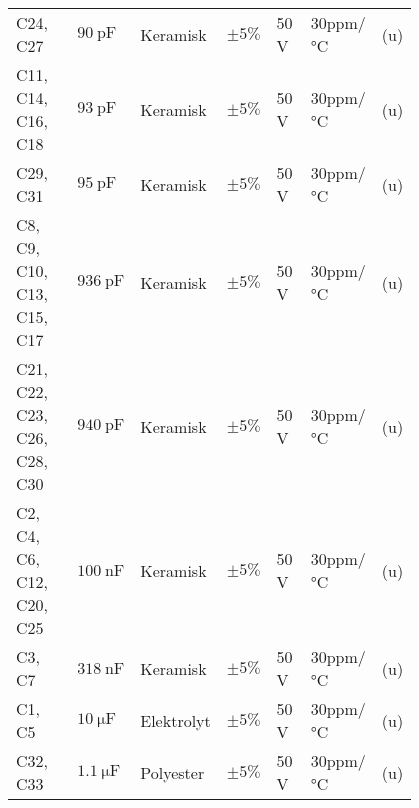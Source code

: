 \begin{table}[h!]
\begin{threeparttable}
\begin{tabular}{p{0.25\linewidth}p{0.1\linewidth}p{0.15\linewidth}p{0.05\linewidth}p{0.1\linewidth}p{0.1\linewidth}p{0.05\linewidth}}
C24, C27 & $\SI{90}{\pico\farad}$ & Keramisk & $\pm 5\%$ & 50 \si{\volt} & 30ppm/\si{\celsius} & (u)\\
C11, C14, C16, C18 & $\SI{93}{\pico\farad}$ & Keramisk & $\pm 5\%$ & 50 \si{\volt} & 30ppm/\si{\celsius} & (u)\\
C29, C31 & $\SI{95}{\pico\farad}$ & Keramisk & $\pm 5\%$ & 50 \si{\volt} & 30ppm/\si{\celsius} & (u)\\
C8, C9, C10, C13, C15, C17 & $\SI{936}{\pico\farad}$ & Keramisk & $\pm 5\%$ & 50 \si{\volt} & 30ppm/\si{\celsius} & (u)\\
C21, C22, C23, C26, C28, C30 & $\SI{940}{\pico\farad}$ & Keramisk & $\pm 5\%$ & 50 \si{\volt} & 30ppm/\si{\celsius} & (u)\\
C2, C4, C6, C12, C20, C25 & $\SI{100}{\nano\farad}$ & Keramisk & $\pm 5\%$ & 50 \si{\volt} & 30ppm/\si{\celsius} & (u)\\
C3, C7  & $\SI{318}{\nano\farad}$ & Keramisk & $\pm 5\%$ & 50 \si{\volt} & 30ppm/\si{\celsius} & (u)\\
C1, C5 & $\SI{10}{\micro\farad}$ & Elektrolyt & $\pm 5\%$ & 50 \si{\volt} & 30ppm/\si{\celsius} & (u)\\
C32, C33 & $\SI{1.1}{\micro\farad}$ & Polyester & $\pm 5\%$ & 50 \si{\volt} & 30ppm/\si{\celsius} & (u)\\


\end{tabular}
\end{threeparttable}
\end{table}
